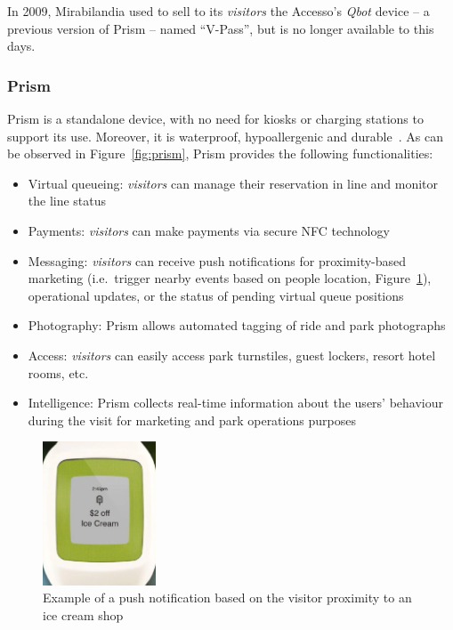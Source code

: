 In 2009, Mirabilandia used to sell to its \textit{visitors} the Accesso's \textit{Qbot} device -- a previous version of Prism -- named ``V-Pass''\cite{v-pass-mira}, but is no
longer available to this days.

\subsubsection*{Prism}
Prism is a standalone device, with no need for kiosks or charging stations to support its use.
Moreover, it is waterproof, hypoallergenic and durable~\cite{prism-desc}.
As can be observed in Figure~\ref{fig:prism}, Prism provides the following functionalities:
\begin{itemize}
	\item Virtual queueing: \textit{visitors} can manage their reservation in line and monitor the line status
	\item Payments: \textit{visitors} can make payments via secure NFC technology
	\item Messaging: \textit{visitors} can receive push notifications for proximity-based marketing (i.e.\ trigger nearby events based on people location, Figure~\ref{fig:prism-icecream}), operational updates, or the status of pending virtual queue positions
	\item Photography: Prism allows automated tagging of ride and park photographs
	\item Access: \textit{visitors} can easily access park turnstiles, guest lockers, resort hotel rooms, etc.
	\item Intelligence: Prism collects real-time information about the users' behaviour during the visit for marketing and park operations purposes
\end{itemize}

\begin{figure}[H]
	\centering
	\includegraphics[width=0.3\textwidth]{img/prism-icecream}
	\caption{Example of a push notification based on the visitor proximity to an ice cream shop}
	\label{fig:prism-icecream}
\end{figure}

